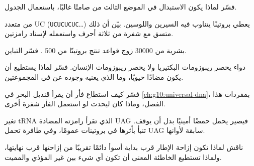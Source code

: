 \begin{exercise}[$\star\star$]\label{exo:g11:gene-expression:9}
فسّر لماذا يكون الاستبدال في الموضع الثالث من  صامتًا غالبًا،
باستعمال الجدول.
\end{exercise}

\begin{exercise}[$\star\star$]\label{exo:g11:gene-expression:10}
 من متعدد UC (\texttt{UCUCUCUC}\dots) يعطي بروتينًا يتناوب فيه
السيرين واللوسين. بيّن أن ذلك متسق مع شفرة من ثلاثة أحرف واستعمله
لإسناد رامزتين.
\end{exercise}

\begin{exercise}[$\star\star$]\label{exo:g11:gene-expression:11}
 بشرية من \num{30000} زوج قواعد تنتج بروتينًا من 500 .
فسّر التباين.
\end{exercise}

\begin{exercise}[$\star\star\star$]\label{exo:g11:gene-expression:12}
دواء يحصر ريبوزومات البكتيريا ولا يحصر ريبوزومات الإنسان. فسّر لماذا
يستطيع أن يكون مضادًا حيويًا، وما الذي يعنيه وجوده عن  في
المجموعتين.
\end{exercise}

\begin{exercise}[$\star\star\star$]\label{exo:g11:gene-expression:13}
فسّر كيف استطاع فأر أن يقرأ  قنديل البحر في
\cref{ch:g10:universal-dna}، بمفردات هذا الفصل، وماذا كان ليحدث لو
استعمل الفأر شفرة أخرى.
\end{exercise}

\begin{exercise}[$\star\star\star$]\label{exo:g11:gene-expression:14}
 تغير tRNA الذي تقرأ رامزته المضادة UAG فيصير يحمل حمضًا أمينيًا
بدل أن يوقف. تنبأ بأثرها في بروتينات  عمومًا، وفي  طافرة
تحمل UAG سابقة لأوانها.
\end{exercise}

\begin{exercise}[$\star\star\star$]\label{exo:g11:gene-expression:15}
ناقش لماذا تكون إزاحة الإطار قرب بداية  أسوأ دائمًا تقريبًا من
إزاحتها قرب نهايتها، ولماذا تستطيع  الخاطئة المعنى أن تكون أي
شيء بين غير المؤذي والمميت.
\end{exercise}

